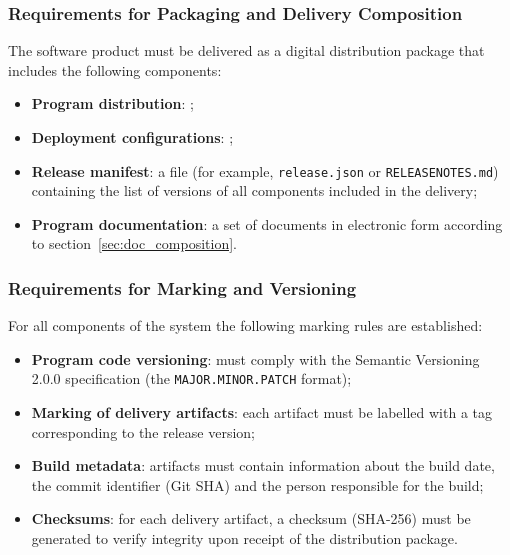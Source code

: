 \documentclass[12pt,a4paper]{extarticle}
\begin{document}
\subsubsection{Requirements for Packaging and Delivery Composition}

\begin{hseExample}
The software product must be delivered as a digital distribution package that includes the following components:
\begin{itemize}[nosep, leftmargin=1.25cm]
    \item \textbf{Program distribution}: ;
    \item \textbf{Deployment configurations}: ;
    \item \textbf{Release manifest}: a file (for example, \texttt{release.json} or \texttt{RELEASENOTES.md}) containing the list of versions of all components included in the delivery;
    \item \textbf{Program documentation}: a set of documents in electronic form according to section~\ref{sec:doc_composition}.
\end{itemize}
\end{hseExample}

\subsubsection{Requirements for Marking and Versioning}

\begin{hseExample}
For all components of the system the following marking rules are established:
\begin{itemize}[nosep, leftmargin=1.25cm]
    \item \textbf{Program code versioning}: must comply with the Semantic Versioning 2.0.0 specification (the \texttt{MAJOR.MINOR.PATCH} format);
    \item \textbf{Marking of delivery artifacts}: each artifact must be labelled with a tag corresponding to the release version;
    \item \textbf{Build metadata}: artifacts must contain information about the build date, the commit identifier (Git SHA) and the person responsible for the build;
    \item \textbf{Checksums}: for each delivery artifact, a checksum (SHA-256) must be generated to verify integrity upon receipt of the distribution package.
\end{itemize}
\end{hseExample}
\end{document}
